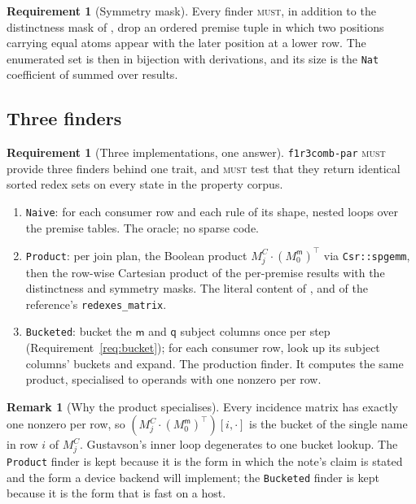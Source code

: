 \documentclass[11pt,a4paper]{article}
\newcommand{\code}[1]{\texttt{#1}}
\newcommand{\MUST}{\textsc{must}}
\newcommand{\mm}{\mathsf{m}}
\newcommand{\qq}{\mathsf{q}}
\theoremstyle{definition}
\newtheorem{requirement}[definition]{Requirement}
\newtheorem{remark}[definition]{Remark}
\theoremstyle{plain}
\begin{document}
\begin{requirement}[Symmetry mask]\label{req:symmask}
Every finder \MUST{}, in addition to the distinctness mask of
\cite[\S7.1]{matnote}, drop an ordered premise tuple in which two positions
carrying equal atoms appear with the later position at a lower row. The
enumerated set is then in bijection with derivations, and its size is the
\code{Nat} coefficient of \cite[Prop.~5.3]{matnote} summed over results.
\end{requirement}

\subsection{Three finders}

\begin{requirement}[Three implementations, one answer]\label{req:finders}
\code{f1r3comb-par} \MUST{} provide three finders behind one trait, and
\MUST{} test that they return identical sorted redex sets on every state in
the property corpus.
\begin{enumerate}[leftmargin=1.6em]
\item \code{Naive}: for each consumer row and each rule of its shape, nested
loops over the premise tables. The oracle; no sparse code.
\item \code{Product}: per join plan, the Boolean product
$M^{C}_{j} \cdot (M^{\mm}_{0})^{\top}$ via \code{Csr::spgemm}, then the
row-wise Cartesian product of the per-premise results with the distinctness
and symmetry masks. The literal content of \cite[\S7.1]{matnote}, and of the
reference's \code{redexes\_matrix}.
\item \code{Bucketed}: bucket the $\mm$ and $\qq$ subject columns once per
step (Requirement~\ref{req:bucket}); for each consumer row, look up its
subject columns' buckets and expand. The production finder. It computes the
same product, specialised to operands with one nonzero per row.
\end{enumerate}
\end{requirement}

\begin{remark}[Why the product specialises]
Every incidence matrix has exactly one nonzero per row, so
$(M^{C}_{j}\cdot(M^{\mm}_{0})^{\top})[i,\cdot]$ is the bucket of the single
name in row $i$ of $M^{C}_{j}$. Gustavson's inner loop degenerates to one
bucket lookup. The \code{Product} finder is kept because it is the form in
which the note's claim is stated and the form a device backend will
implement; the \code{Bucketed} finder is kept because it is the form that is
fast on a host.
\end{remark}
\end{document}
